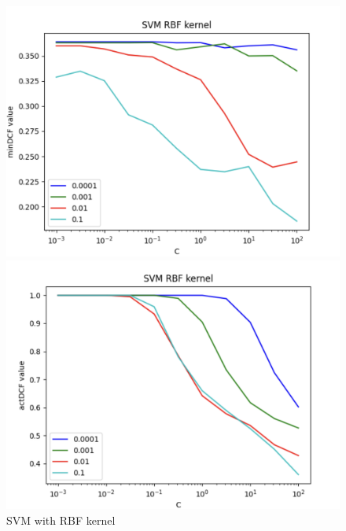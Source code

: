 \documentclass{article}
\begin{document}
    \begin{figure}[H]
        \centering
        \begin{minipage}{.4\textwidth}
            \centering
            \includegraphics[width=\linewidth]{./img/SVM_RBF1.png}
        \end{minipage}%
        \begin{minipage}{.4\textwidth}
            \centering
            \includegraphics[width=\linewidth]{./img/SVM_RBF2.png}
        \end{minipage}
        \caption{SVM with RBF kernel} %
        \label{fig:SVM_RBF} %
    \end{figure}
\end{document}
